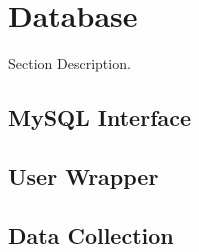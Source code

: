 \section{Database}
\label{sect:database}
Section Description.  

\subsection{MySQL Interface}

\subsection{User Wrapper}

\subsection{Data Collection}

